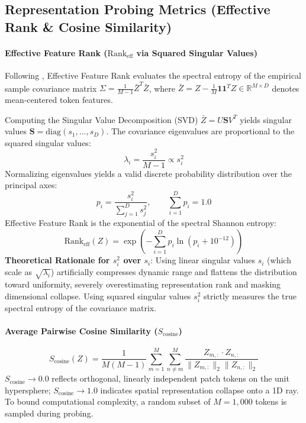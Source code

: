 \documentclass{article}
\begin{document}
\subsection{Representation Probing Metrics (Effective Rank \& Cosine Similarity)}

\paragraph{Effective Feature Rank ($\text{Rank}_{\text{eff}}$ via Squared Singular Values)}
Following \citet{roy2007effective}, Effective Feature Rank evaluates the spectral entropy of the empirical sample covariance matrix $\Sigma = \frac{1}{M - 1} \bar{Z}^T \bar{Z}$, where $\bar{Z} = Z - \frac{1}{M} \mathbf{1} \mathbf{1}^T Z \in \mathbb{R}^{M \times D}$ denotes mean-centered token features.

Computing the Singular Value Decomposition (SVD) $\bar{Z} = U \mathbf{S} V^T$ yields singular values $\mathbf{S} = \text{diag}(s_1, \dots, s_D)$. The covariance eigenvalues are proportional to the squared singular values:
\begin{equation}
    \lambda_i = \frac{s_i^2}{M - 1} \propto s_i^2
\end{equation}
Normalizing eigenvalues yields a valid discrete probability distribution over the principal axes:
\begin{equation}
    p_i = \frac{s_i^2}{\sum_{j=1}^D s_j^2}, \qquad \sum_{i=1}^D p_i = 1.0
\end{equation}
Effective Feature Rank is the exponential of the spectral Shannon entropy:
\begin{equation}
    \text{Rank}_{\text{eff}}(Z) = \exp\left( - \sum_{i=1}^D p_i \ln(p_i + 10^{-12}) \right)
\end{equation}
\textbf{Theoretical Rationale for $s_i^2$ over $s_i$}: Using linear singular values $s_i$ (which scale as $\sqrt{\lambda_i}$) artificially compresses dynamic range and flattens the distribution toward uniformity, severely overestimating representation rank and masking dimensional collapse. Using squared singular values $s_i^2$ strictly measures the true spectral entropy of the covariance matrix.

\paragraph{Average Pairwise Cosine Similarity ($S_{\text{cosine}}$)}
\begin{equation}
    S_{\text{cosine}}(Z) = \frac{1}{M(M - 1)} \sum_{m=1}^M \sum_{n \neq m}^M \frac{Z_{m, :} \cdot Z_{n, :}}{\|Z_{m, :}\|_2 \|Z_{n, :}\|_2}
\end{equation}
$S_{\text{cosine}} \to 0.0$ reflects orthogonal, linearly independent patch tokens on the unit hypersphere; $S_{\text{cosine}} \to 1.0$ indicates spatial representation collapse onto a 1D ray. To bound computational complexity, a random subset of $M = 1,000$ tokens is sampled during probing.
\end{document}
